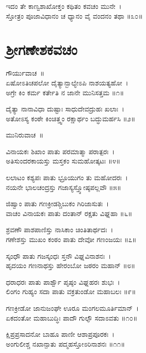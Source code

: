 ಇದಂ ತೇ ಕಾಣ್ವಶಾಖೋಕ್ತಂ ಕಥಿತಂ ಕವಚಂ ಮುನೇ~।\\
ಸ್ತೋತ್ರಂ ಪೂಜಾವಿಧಾನಂ ಚ ಧ್ಯಾನಂ ವೈ ವಂದನಂ ತಥಾ ॥೩೦॥

\section{ಶ್ರೀಗಣೇಶಕವಚಂ }
ಗೌರ್ಯುವಾಚ~॥\\
ಏಷೋಽತಿಚಪಲೋ ದೈತ್ಯಾನ್ಬಾಲ್ಯೇಽಪಿ ನಾಶಯತ್ಯಹೋ~।\\
ಅಗ್ರೇ ಕಿಂ ಕರ್ಮ ಕರ್ತೇತಿ ನ ಜಾನೇ ಮುನಿಸತ್ತಮ ॥೧॥

ದೈತ್ಯಾ ನಾನಾವಿಧಾ ದುಷ್ಟಾಃ ಸಾಧುದೇವದ್ರುಹಃ ಖಲಾಃ~।\\
ಅತೋಽಸ್ಯ ಕಂಠೇ ಕಿಂಚಿತ್ತ್ವಂ ರಕ್ಷಾರ್ಥಂ ಬದ್ಧುಮರ್ಹಸಿ ॥೨॥

ಮುನಿರುವಾಚ~॥\\

ವಿನಾಯಕಃ ಶಿಖಾಂ ಪಾತು ಪರಮಾತ್ಮಾ ಪರಾತ್ಪರಃ~।\\
ಅತಿಸುಂದರಕಾಯಸ್ತು ಮಸ್ತಕಂ ಸುಮಹೋತ್ಕಟಃ ॥೪॥

ಲಲಾಟಂ ಕಶ್ಯಪಃ ಪಾತು ಭ್ರೂಯುಗಂ ತು ಮಹೋದರಃ~।\\
ನಯನೇ ಭಾಲಚಂದ್ರಸ್ತು ಗಜಾಸ್ಯಸ್ತ್ವೋಷ್ಠಪಲ್ಲವೌ ॥೫॥

ಜಿಹ್ವಾಂ ಪಾತು ಗಣಕ್ರೀಡಶ್ಚಿಬುಕಂ ಗಿರಿಜಾಸುತಃ~।\\
ವಾಚಂ ವಿನಾಯಕಃ ಪಾತು ದಂತಾನ್ ರಕ್ಷತು ವಿಘ್ನಹಾ ॥೬॥

ಶ್ರವಣೌ ಪಾಶಪಾಣಿಸ್ತು ನಾಸಿಕಾಂ ಚಿಂತಿತಾರ್ಥದಃ~।\\
ಗಣೇಶಸ್ತು ಮುಖಂ ಕಂಠಂ ಪಾತು ದೇವೋ ಗಣಂಜಯಃ ॥೭॥

ಸ್ಕಂಧೌ ಪಾತು ಗಜಸ್ಕಂಧಃ ಸ್ತನೌ ವಿಘ್ನವಿನಾಶನಃ~।\\
ಹೃದಯಂ ಗಣನಾಥಸ್ತು ಹೇರಂಬೋ ಜಠರಂ ಮಹಾನ್ ॥೮॥

ಧರಾಧರಃ ಪಾತು ಪಾರ್ಶ್ವೌ ಪೃಷ್ಠಂ ವಿಘ್ನಹರಃ ಶುಭಃ~।\\
ಲಿಂಗಂ ಗುಹ್ಯಂ ಸದಾ ಪಾತು ವಕ್ರತುಂಡೋ ಮಹಾಬಲಃ ॥೯॥

ಗಣಕ್ರೀಡೋ ಜಾನುಜಂಘೇ ಊರೂ ಮಂಗಲಮೂರ್ತಿಮಾನ್~।\\
ಏಕದಂತೋ ಮಹಾಬುದ್ಧಿಃ ಪಾದೌ ಗುಲ್ಫೌ ಸದಾಽವತು ॥೧೦॥

ಕ್ಷಿಪ್ರಪ್ರಸಾದನೋ ಬಾಹೂ ಪಾಣೀ ಆಶಾಪ್ರಪೂರಕಃ~।\\
ಅಂಗುಲೀಶ್ಚ ನಖಾನ್ಪಾತು ಪದ್ಮಹಸ್ತೋಽರಿನಾಶನಃ ॥೧೧॥

